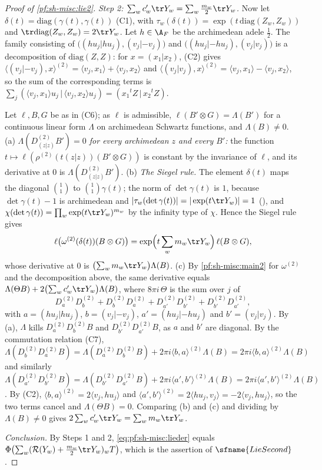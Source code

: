 \begin{proof}[Proof of \cref{pf:sh-misc:lie2}]
\emph{Step 2: $\sum_wc'_w\tr Y_w=\sum_w\frac{m_w}2\tr Y_w$.} Now let $\delta(t)=\mathrm{diag}(\gamma(t),\gamma(t))$ (C1), with
$\tau_w(\delta(t))=\exp(t\,\mathrm{diag}(Z_w,Z_w))$ and $\tr\mathrm{diag}(Z_w,Z_w)=2\tr Y_w$. Let $h\in\A_F$ be the archimedean adele $\frac12$. The
family consisting of $\bigl((hu_j|hu_j),(v_j|-v_j)\bigr)$ and $\bigl((hu_j|-hu_j),(v_j|v_j)\bigr)$ is a decomposition of $\mathrm{diag}(Z,Z)$: for
$x=(x_1|x_2)$, (C2) gives $\langle(v_j|-v_j),x\rangle^{(2)}=\langle v_j,x_1\rangle+\langle v_j,x_2\rangle$ and
$\langle(v_j|v_j),x\rangle^{(2)}=\langle v_j,x_1\rangle-\langle v_j,x_2\rangle$, so the sum of the corresponding terms is
$\sum_j(\langle v_j,x_1\rangle u_j\,|\,\langle v_j,x_2\rangle u_j)=(x_1{}^tZ\,|\,x_2{}^tZ)$.

Let $\ell,B,G$ be as in (C6); as $\ell$ is admissible, $\ell(B'\otimes G)=\Lambda(B')$ for a continuous linear form $\Lambda$ on archimedean
Schwartz functions, and $\Lambda(B)\ne0$. (a) \emph{$\Lambda(D^{(2)}_{(z|z)}B')=0$ for every archimedean $z$ and every $B'$:} the function
$t\mapsto\ell(\rho^{(2)}(t(z|z))(B'\otimes G))$ is constant by the invariance of $\ell$, and its derivative at $0$ is $\Lambda(D^{(2)}_{(z|z)}B')$.
(b) \emph{The Siegel rule.} The element $\delta(t)$ maps the diagonal ${1\choose1}$ to ${1\choose1}\gamma(t)$; the norm of $\det\gamma(t)$ is
$1$, because $\det\gamma(t)-1$ is archimedean and $|\tau_w(\det\gamma(t))|=|\exp(t\tr Y_w)|=1$ (),
and $\chi(\det\gamma(t))=\prod_w\exp(t\tr Y_w)^{m_w}$ by the infinity type of $\chi$. Hence the Siegel rule gives
\[
\ell\bigl(\omega^{(2)}(\delta(t))(B\otimes G)\bigr)=\exp\Bigl(t\sum_wm_w\tr Y_w\Bigr)\,\ell(B\otimes G),
\]
whose derivative at $0$ is $\bigl(\sum_wm_w\tr Y_w\bigr)\Lambda(B)$. (c) By \cref{pf:sh-misc:main2} for $\omega^{(2)}$ and the decomposition above,
the same derivative equals $\Lambda(\Theta B)+2\bigl(\sum_wc'_w\tr Y_w\bigr)\Lambda(B)$, where $8\pi i\,\Theta$ is the sum over $j$ of
\[
D^{(2)}_{a}D^{(2)}_{b}+D^{(2)}_{b}D^{(2)}_{a}+D^{(2)}_{a'}D^{(2)}_{b'}+D^{(2)}_{b'}D^{(2)}_{a'},
\]
with $a=(hu_j|hu_j)$, $b=(v_j|-v_j)$, $a'=(hu_j|-hu_j)$ and $b'=(v_j|v_j)$.
By (a), $\Lambda$ kills $D^{(2)}_aD^{(2)}_bB$ and $D^{(2)}_{b'}D^{(2)}_{a'}B$, as $a$ and $b'$ are diagonal. By the commutation relation (C7),
$\Lambda(D^{(2)}_bD^{(2)}_aB)=\Lambda(D^{(2)}_aD^{(2)}_bB)+2\pi i\langle b,a\rangle^{(2)}\Lambda(B)=2\pi i\langle b,a\rangle^{(2)}\Lambda(B)$ and
similarly $\Lambda(D^{(2)}_{a'}D^{(2)}_{b'}B)=\Lambda(D^{(2)}_{b'}D^{(2)}_{a'}B)+2\pi i\langle a',b'\rangle^{(2)}\Lambda(B)
=2\pi i\langle a',b'\rangle^{(2)}\Lambda(B)$. By (C2), $\langle b,a\rangle^{(2)}=2\langle v_j,hu_j\rangle$ and
$\langle a',b'\rangle^{(2)}=2\langle hu_j,v_j\rangle=-2\langle v_j,hu_j\rangle$, so the two terms cancel and $\Lambda(\Theta B)=0$. Comparing (b)
and (c) and dividing by $\Lambda(B)\ne0$ gives $2\sum_wc'_w\tr Y_w=\sum_wm_w\tr Y_w$.

\emph{Conclusion.} By Steps 1 and 2, \eqref{eq:pf:sh-misc:lieder} equals $\Phi\bigl(\sum_w(\shmiscR(Y_w)+\frac{m_w}2\tr Y_w)_wT\bigr)$, which is
the assertion of $\sfname{LieSecond}$.
\end{proof}

